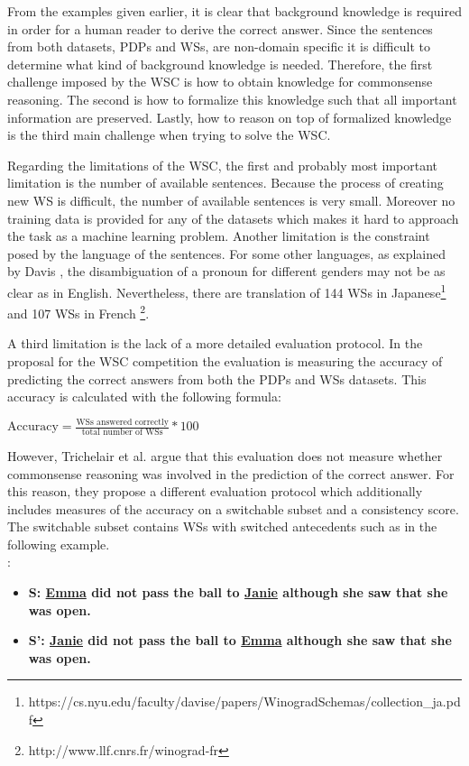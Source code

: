From the examples given earlier, it is clear that background knowledge is required in order for a human reader to derive the correct answer. Since the sentences from both datasets, PDPs and WSs, are non-domain specific it is difficult to determine what kind of background knowledge is needed. Therefore, the first challenge imposed by the WSC is how to obtain knowledge for commonsense reasoning. 
The second is how to formalize this knowledge such that all important information are preserved. Lastly, how to reason on top of formalized knowledge is the third main challenge when trying to solve the WSC. 

Regarding the limitations of the WSC, the first and probably most important limitation is the number of available sentences. Because the process of creating new WS is difficult, the number of available sentences is very small. Moreover no training data is provided for any of the datasets which makes it hard to approach the task as a machine learning problem. Another limitation is the constraint posed by the language of the sentences. For some other languages, as explained by Davis \cite{DBLP:journals/corr/Davis16}, the disambiguation of a pronoun for different genders may not be as clear as in English. Nevertheless, there are translation of 144 WSs in Japanese\footnote{https://cs.nyu.edu/faculty/davise/papers/WinogradSchemas/collection\_ja.pdf} and 107 WSs in French \footnote{http://www.llf.cnrs.fr/winograd-fr}. 

A third limitation is the lack of a more detailed evaluation protocol. In the proposal for the WSC competition the evaluation is measuring the accuracy of predicting the correct answers from both the PDPs and WSs datasets. This accuracy is calculated with the following formula: \\
\begin{center}
\begin{math}
	\text{Accuracy} = \frac{\text{WSs answered correctly}}{\text{total number of WSs}} * 100
\end{math}
\end{center}
However, Trichelair et al. \cite{DBLP:journals/corr/abs-1811-01778} argue that this evaluation does not measure whether commonsense reasoning was involved in the prediction of the correct answer. For this reason, they propose a different evaluation protocol which additionally includes measures of the accuracy on a switchable subset and a consistency score. The switchable subset contains WSs with switched antecedents such as in the following example. \\
:
\begin{itemize} 
	\item \textbf{S: \underline{Emma} did not pass the ball to \underline{Janie} although she saw that she was open.}
	\item \textbf{S': \underline{Janie} did not pass the ball to \underline{Emma} although she saw that she was open.} 
\end{itemize}


